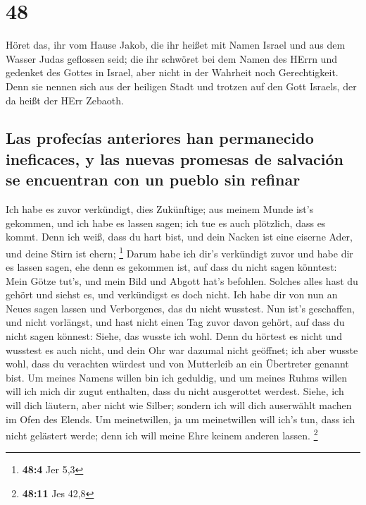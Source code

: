 \hypertarget{section-47}{%
\section{48}\label{section-47}}

 Höret das, ihr vom Hause Jakob, die ihr heißet mit Namen
Israel und aus dem Wasser Judas geflossen seid; die ihr schwöret bei dem
Namen des HErrn und gedenket des Gottes in Israel, aber nicht in der
Wahrheit noch Gerechtigkeit.  Denn sie nennen sich aus der
heiligen Stadt und trotzen auf den Gott Israels, der da heißt der HErr
Zebaoth.

\hypertarget{las-profecuxedas-anteriores-han-permanecido-ineficaces-y-las-nuevas-promesas-de-salvaciuxf3n-se-encuentran-con-un-pueblo-sin-refinar}{%
\subsection{Las profecías anteriores han permanecido ineficaces, y las
nuevas promesas de salvación se encuentran con un pueblo sin
refinar}\label{las-profecuxedas-anteriores-han-permanecido-ineficaces-y-las-nuevas-promesas-de-salvaciuxf3n-se-encuentran-con-un-pueblo-sin-refinar}}

 Ich habe es zuvor verkündigt, dies Zukünftige; aus meinem
Munde ist's gekommen, und ich habe es lassen sagen; ich tue es auch
plötzlich, dass es kommt.  Denn ich weiß, dass du hart
bist, und dein Nacken ist eine eiserne Ader, und deine Stirn ist ehern;
\footnote{\textbf{48:4} Jer 5,3}  Darum habe ich dir's
verkündigt zuvor und habe dir es lassen sagen, ehe denn es gekommen ist,
auf dass du nicht sagen könntest: Mein Götze tut's, und mein Bild und
Abgott hat's befohlen.  Solches alles hast du gehört und
siehst es, und verkündigst es doch nicht. Ich habe dir von nun an Neues
sagen lassen und Verborgenes, das du nicht wusstest.  Nun
ist's geschaffen, und nicht vorlängst, und hast nicht einen Tag zuvor
davon gehört, auf dass du nicht sagen könnest: Siehe, das wusste ich
wohl.  Denn du hörtest es nicht und wusstest es auch
nicht, und dein Ohr war dazumal nicht geöffnet; ich aber wusste wohl,
dass du verachten würdest und von Mutterleib an ein Übertreter genannt
bist.  Um meines Namens willen bin ich geduldig, und um
meines Ruhms willen will ich mich dir zugut enthalten, dass du nicht
ausgerottet werdest.  Siehe, ich will dich läutern, aber
nicht wie Silber; sondern ich will dich auserwählt machen im Ofen des
Elends.  Um meinetwillen, ja um meinetwillen will ich's
tun, dass ich nicht gelästert werde; denn ich will meine Ehre keinem
anderen lassen. \footnote{\textbf{48:11} Jes 42,8}

